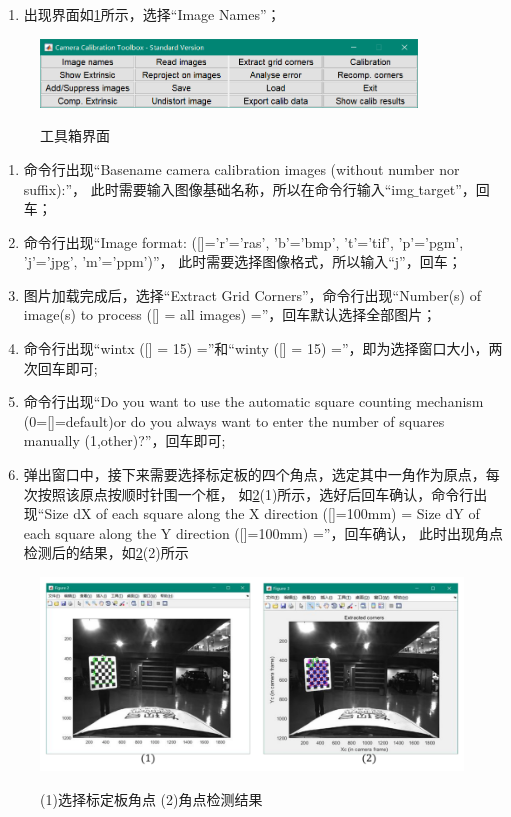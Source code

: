 \begin{enumerate}[$\star$]
\item 出现界面如\figurename\ref{fig: pic7}所示，选择“Image Names”；
\end{enumerate}

\begin{figure}[htbp]
    \centering
    \includegraphics[width=10cm]{pic/7.png} \\
    \caption{工具箱界面}\label{fig: pic7}
\end{figure}

\begin{enumerate}[$\star$]
\item 命令行出现“Basename camera calibration images (without number nor suffix):”，
此时需要输入图像基础名称，所以在命令行输入“img$\_$target”，回车；
\item 命令行出现“Image format: ([]='r'='ras', 'b'='bmp', 't'='tif', 'p'='pgm', 'j'='jpg', 'm'='ppm')”，
此时需要选择图像格式，所以输入“j”，回车；
\item 图片加载完成后，选择“Extract Grid Corners”，命令行出现“Number(s) of image(s) to process
 ([] = all images) =”，回车默认选择全部图片；
\item 命令行出现“wintx ([] = 15) =”和“winty ([] = 15) =”，即为选择窗口大小，两次回车即可;
\item 命令行出现“Do you want to use the automatic square counting mechanism 
(0=[]=default)or do you always want to enter the number of squares manually (1,other)?”，回车即可;
\item 弹出窗口中，接下来需要选择标定板的四个角点，选定其中一角作为原点，每次按照该原点按顺时针围一个框，
如\figurename\ref{fig: pic8}(1)所示，选好后回车确认，命令行出现“Size dX of each square along the X direction 
([]=100mm) =  Size dY of each square along the Y direction ([]=100mm) =”，回车确认，
此时出现角点检测后的结果，如\figurename\ref{fig: pic8}(2)所示
\end{enumerate}

\begin{figure}[htbp]
    \centering
    \includegraphics[width=14cm]{pic/8.pdf} \\
    \caption{(1)选择标定板角点 (2)角点检测结果}\label{fig: pic8}
\end{figure}

